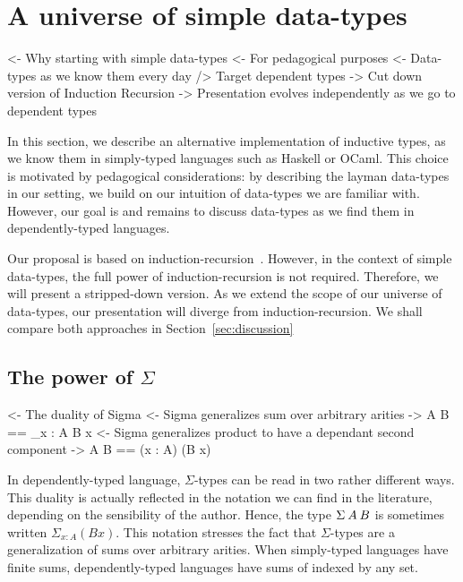 \section{A universe of simple data-types}

\begin{wstructure}
<- Why starting with simple data-types
    <- For pedagogical purposes
        <- Data-types as we know them every day
        /> Target dependent types
    -> Cut down version of Induction Recursion
        -> Presentation evolves independently as we go to dependent types
\end{wstructure}

In this section, we describe an alternative implementation of
inductive types, as we know them in simply-typed languages such as
Haskell or OCaml. This choice is motivated by pedagogical
considerations: by describing the layman data-types in our setting, we
build on our intuition of data-types we are familiar with. However,
our goal is and remains to discuss data-types as we find them in
dependently-typed languages.

Our proposal is based on induction-recursion~\cite{dybjer:general-ir,
  dybjer:axiom-ir, dybjer:ir-initial-algebra, dybjer:iir}. However, in
the context of simple data-types, the full power of
induction-recursion is not required. Therefore, we will present a
stripped-down version. As we extend the scope of our universe of
data-types, our presentation will diverge from induction-recursion. We
shall compare both approaches in Section~\ref{sec:discussion}

\subsection{The power of $\Sigma$}

\begin{wstructure}
<- The duality of Sigma
    <- Sigma generalizes sum over arbitrary arities
        -> \Sigma A B == \Sigma_{x : A} B x
    <- Sigma generalizes product to have a dependant second component
        -> \Sigma A B == (x : A) \times (B x)
\end{wstructure}

In dependently-typed language, $\Sigma$-types can be read in two
rather different ways. This duality is actually reflected in the
notation we can find in the literature, depending on the sensibility
of the author. Hence, the type $\SigmaTy{A}{B}$ is sometimes written
$\Sigma_{x : A} (B x)$. This notation stresses the fact that
$\Sigma$-types are a generalization of sums over arbitrary
arities. When simply-typed languages have finite sums,
dependently-typed languages have sums of indexed by any set.

